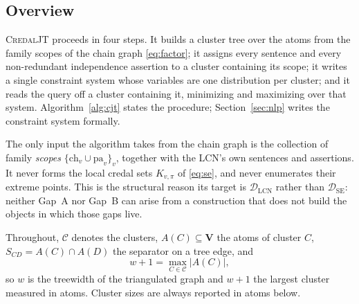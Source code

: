 \documentclass[11pt]{article}
\theoremstyle{definition}
\newcommand{\DSE}{\mathcal{D}_{\mathrm{SE}}}
\newcommand{\DLCN}{\mathcal{D}_{\mathrm{LCN}}}
\newcommand{\ch}{\mathrm{ch}}
\newcommand{\pa}{\mathrm{pa}}
\begin{document}
\subsection{Overview}\label{sec:algo-overview}

\textsc{CredalJT} proceeds in four steps. It builds a cluster tree over the atoms
from the family scopes of the chain graph \eqref{eq:factor}; it assigns every
sentence and every non-redundant independence assertion to a cluster containing
its scope; it writes a single constraint system whose variables are one
distribution per cluster; and it reads the query off a cluster containing it,
minimizing and maximizing over that system. Algorithm~\ref{alg:cjt} states the
procedure; Section~\ref{sec:nlp} writes the constraint system formally.

The only input the algorithm takes from the chain graph is the collection of
family \emph{scopes} $\{\ch_v\cup\pa_v\}_v$, together with the LCN's own
sentences and assertions. It never forms the local credal sets $K_{v,\pi}$ of
\eqref{eq:se}, and never enumerates their extreme points. This is the structural
reason its target is $\DLCN$ rather than $\DSE$: neither Gap~A nor Gap~B can
arise from a construction that does not build the objects in which those gaps
live.

Throughout, $\mathcal C$ denotes the clusters, $A(C)\subseteq\mathbf V$ the atoms
of cluster $C$, $S_{CD}=A(C)\cap A(D)$ the separator on a tree edge, and
\begin{equation}\label{eq:width}
  w+1=\max_{C\in\mathcal C}|A(C)|,
\end{equation}
so $w$ is the treewidth of the triangulated graph and $w+1$ the largest cluster
measured in atoms. Cluster sizes are always reported in atoms below.
\end{document}
